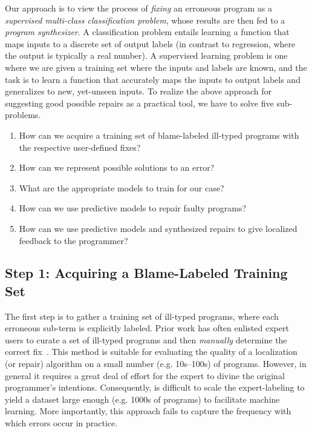  Our approach is to view the process of \emph{fixing} an erroneous program as a \emph{supervised multi-class classification problem}, whose results are then fed to a \emph{program synthesizer}. A classification problem entails learning a function that maps inputs to a discrete set of output labels (in contrast to regression, where the output is typically a real number). A supervised learning problem is one where we are given a training set where the inputs and labels are known, and the task is to learn a function that accurately maps the inputs to output labels and generalizes to new, yet-unseen inputs. To realize the above approach for suggesting good possible repairs as a practical tool, we have to solve five sub-problems.
\begin{enumerate}
  \item How can we acquire a training set of blame-labeled ill-typed programs with the respective user-defined fixes?
  \item How can we represent possible solutions to an error?
  \item What are the appropriate models to train for our case?
  \item How can we use predictive models to repair faulty programs?
  \item How can we use predictive models and synthesized repairs to give localized feedback to the programmer?
\end{enumerate}



\subsection{Step 1: Acquiring a Blame-Labeled Training Set}

The first step is to gather a training set of ill-typed programs, where each erroneous sub-term is explicitly labeled. Prior work has often enlisted expert users to curate a set of ill-typed programs and then
\emph{manually} determine the correct fix~\citep[\eg][]{Lerner2007-dt, Loncaric2016-uk}. This method is suitable for evaluating the quality of a localization (or repair) algorithm on a small number (e.g. 10s–100s) of programs. However, in general it requires a great deal of effort for the expert to divine the original programmer’s intentions. Consequently, is difficult to scale the expert-labeling to yield a dataset large enough (e.g. 1000s of programs) to facilitate machine learning. More importantly, this approach fails to capture the frequency with which errors occur in practice.

